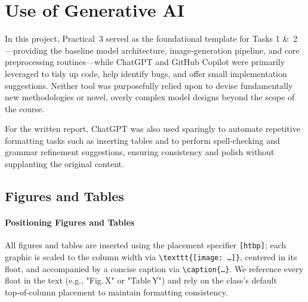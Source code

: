 \documentclass[conference]{IEEEtran}
\begin{document}
\section{Use of Generative AI}

In this project, Practical 3 served as the foundational template for Tasks 1 \& 2—providing the baseline model architecture, image‐generation pipeline, and core preprocessing routines—while ChatGPT and GitHub Copilot were primarily leveraged to tidy up code, help identify bugs, and offer small implementation suggestions. Neither tool was purposefully relied upon to devise fundamentally new methodologies or novel, overly complex model designs beyond the scope of the course. 

For the written report, ChatGPT was also used sparingly to automate repetitive formatting tasks such as inserting tables and to perform spell‑checking and grammar refinement suggestions, ensuring consistency and polish without supplanting the original content.

\subsection{Figures and Tables}

\paragraph{Positioning Figures and Tables}

All figures and tables are inserted using the placement specifier \verb|[htbp]|; each graphic is scaled to the column width via
\verb|\texttt{[image: …]}|, centered in its float, and accompanied by a concise caption via \verb|\caption{…}|. We reference every float in the text (e.g., "Fig. X" or "Table Y") and rely on the class’s default top‑of‑column placement to maintain formatting consistency.
\end{document}
